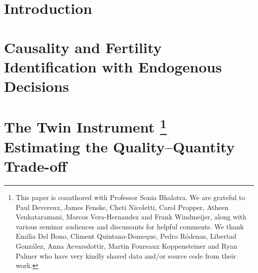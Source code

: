 \documentclass{report}[12pt]
\newcommand{\litrloc}{./literature}
\let\stdsection\thesection
\let\oldchapter\chapter
\renewcommand{\chapter}{\let\thesection\stdsection\oldchapter}
\begin{document}
\newpage
\begin{spacing}{1.4}
\setlength\parindent{0.25in}
\setlength\parskip{0.25in}


\chapter*{Introduction}



\renewcommand*{\thefootnote}{\fnsymbol{footnote}}
\chapter[Causality and Fertilty: Identification with Endogenous Decisions]%
{Causality and Fertility%
\\[2ex]\Large Identification with Endogenous Decisions}
\label{chap:fert}
\renewcommand*{\thefootnote}{\arabic{footnote}}




\renewcommand*{\thefootnote}{\fnsymbol{footnote}}
\chapter[The Twin Instrument and Family Size]%
{The Twin Instrument%
\footnote{This paper is coauthored with Professor Sonia Bhalotra. We are 
grateful to Paul Devereux, James Fenske, Cheti Nicoletti, Carol Propper, Atheen 
Venkataramani, Marcos Vera-Hernandez and Frank Windmeijer, along with various 
seminar audiences and discussants for helpful comments. We thank Emilia Del Bono, 
Climent Quintana-Domeque, Pedro R\'odenas, Libertad Gonz\'alez, Anna 
Aevarsdottir, 
Martin Foureaux Koppensteiner and Ryan Palmer who have very kindly shared data 
and/or source code from their work.} 
\\[2ex]\Large Estimating the Quality--Quantity Trade-off}
\label{chap:twins}
\renewcommand*{\thefootnote}{\arabic{footnote}}


\end{spacing}
\end{document}
